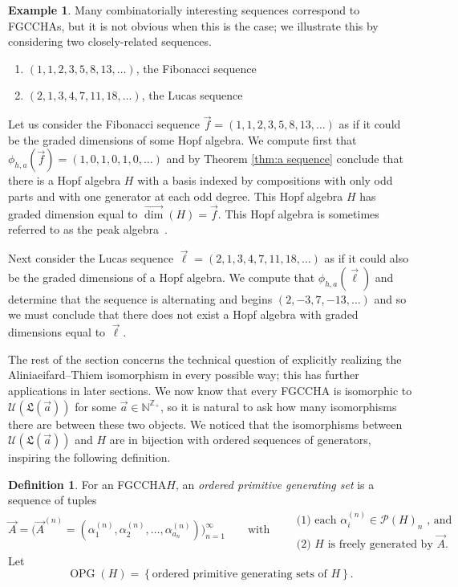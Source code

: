 \documentclass[11pt]{amsart}
\theoremstyle{definition}
\newtheorem{definition}[theorem]{Definition}
\newtheorem{example}[theorem]{Example}
\numberwithin{equation}{section}
\def\NN{{\mathbb N}}
\def\ZZ{{\mathbb Z}}
\newcommand{\FGCCHA}{\textsf{FGCCHA}\xspace}
\newcommand{\FGCCHAs}{\textsf{FGCCHA}s\xspace}
\newcommand{\vecdim}{\overrightarrow{\dim}}
\newcommand{\OPG}{\operatorname{OPG}}
\newcommand{\lucas}[1]{\todo[size=\tiny,color=red!50]{#1 \\ \hfill --- Lucas}}
\begin{document}
\begin{example}
Many combinatorially interesting sequences correspond to \FGCCHAs, but it is not obvious when this is the case; we illustrate this by considering two closely-related sequences.
\begin{enumerate}
\item $(1,1,2,3,5,8,13,\ldots)$, the Fibonacci sequence

\item $(2,1,3,4,7,11,18,\ldots)$, the Lucas sequence
\end{enumerate}
Let us consider the Fibonacci sequence $\vec{f} = (1,1,2,3,5,8,13,\ldots)$
as if it could be the graded dimensions of some Hopf algebra.
We compute first that $\phi_{h,a}(\vec{f}) = (1,0,1,0,1,0,\ldots)$
and by Theorem \ref{thm:a sequence} conclude
that there is a Hopf algebra $H$ with a basis indexed by
compositions with only odd parts and with one generator at each odd degree.
This Hopf algebra $H$ has graded dimension equal to $\vecdim(H) = \vec{f}$.
This Hopf algebra is sometimes referred to as the peak algebra~\cite[\S 2]{Bergeron_2002}.

Next consider the Lucas sequence $\vec{\ell} = (2,1,3,4,7,11,18,\ldots)$
as if it could also be the graded dimensions of a Hopf algebra.  We compute that $\phi_{h,a}(\vec{\ell})$ and determine
that the sequence is alternating and begins $(2, -3, 7, -13,\ldots)$ and so we must conclude
that there does not exist a Hopf algebra with graded dimensions equal to $\vec{\ell}$.
\end{example}

The rest of the section concerns the technical question of explicitly realizing the Aliniaeifard--Thiem isomorphism in every possible way; this has further applications in later sections.  
We now know that every \FGCCHA is isomorphic to $\mathcal{U}(\mathfrak{L}(\vec{a}))$ for some $\vec{a} \in \NN^{\ZZ_{+}}$, so it is natural to ask how many isomorphisms there are between these two objects.  
We noticed that the isomorphisms between $\mathcal{U}(\mathfrak{L}(\vec{a}))$ and $H$ are in bijection with ordered sequences of generators, inspiring the following definition.

\begin{definition}
\label{def:OPG}
For an \FGCCHA $H$, an \emph{ordered primitive generating set} is a sequence of tuples
\[
\vec{A} = \Big(\vec{A}^{(n)} = (\alpha_{1}^{(n)}, \alpha_{2}^{(n)}, \ldots, \alpha_{a_{n}}^{(n)})\Big)_{n = 1}^{\infty}
\qquad\text{with}\qquad
\begin{array}{l}
\text{(1) each $\alpha_{i}^{(n)} \in \mathcal{P}(H)_{n}$ , and} \\
\text{(2) $H$ is freely generated by $\vec{A}$.}
\end{array}
\]
Let
\[
\OPG(H) = \left\{ \text{ordered primitive generating sets of $H$} \right\}.
\]
\end{definition}
\end{document}
